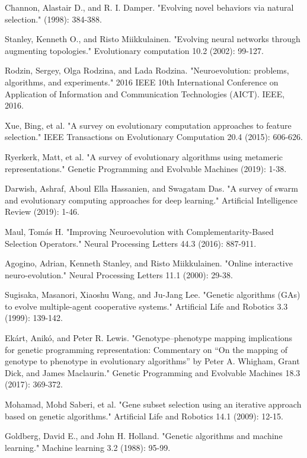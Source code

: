 \documentclass[conference]{IEEEtran}
\begin{document}
\begin{thebibliography}{9}
Channon, Alastair D., and R. I. Damper. "Evolving novel behaviors via natural selection." (1998): 384-388.
 
Stanley, Kenneth O., and Risto Miikkulainen. "Evolving neural networks through augmenting topologies." Evolutionary computation 10.2 (2002): 99-127.
 
Rodzin, Sergey, Olga Rodzina, and Lada Rodzina. "Neuroevolution: problems, algorithms, and experiments." 2016 IEEE 10th International Conference on Application of Information and Communication Technologies (AICT). IEEE, 2016.

Xue, Bing, et al. "A survey on evolutionary computation approaches to feature selection." IEEE Transactions on Evolutionary Computation 20.4 (2015): 606-626.

Ryerkerk, Matt, et al. "A survey of evolutionary algorithms using metameric representations." Genetic Programming and Evolvable Machines (2019): 1-38.

Darwish, Ashraf, Aboul Ella Hassanien, and Swagatam Das. "A survey of swarm and evolutionary computing approaches for deep learning." Artificial Intelligence Review (2019): 1-46.

Maul, Tomás H. "Improving Neuroevolution with Complementarity-Based Selection Operators." Neural Processing Letters 44.3 (2016): 887-911.

Agogino, Adrian, Kenneth Stanley, and Risto Miikkulainen. "Online interactive neuro-evolution." Neural Processing Letters 11.1 (2000): 29-38.

Sugisaka, Masanori, Xiaoshu Wang, and Ju-Jang Lee. "Genetic algorithms (GAs) to evolve multiple-agent cooperative systems." Artificial Life and Robotics 3.3 (1999): 139-142.

Ekárt, Anikó, and Peter R. Lewis. "Genotype–phenotype mapping implications for genetic programming representation: Commentary on “On the mapping of genotype to phenotype in evolutionary algorithms” by Peter A. Whigham, Grant Dick, and James Maclaurin." Genetic Programming and Evolvable Machines 18.3 (2017): 369-372.

Mohamad, Mohd Saberi, et al. "Gene subset selection using an iterative approach based on genetic algorithms." Artificial Life and Robotics 14.1 (2009): 12-15.

Goldberg, David E., and John H. Holland. "Genetic algorithms and machine learning." Machine learning 3.2 (1988): 95-99.


\end{thebibliography}
\end{document}
